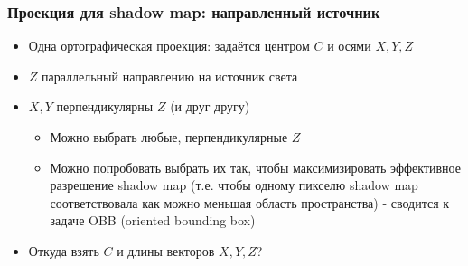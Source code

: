 \documentclass{beamer}
\begin{document}
\begin{frame}[fragile]
\frametitle{Проекция для shadow map: направленный источник}
\begin{itemize}
\item Одна ортографическая проекция: задаётся центром \begin{math}C\end{math} и осями \begin{math}X, Y, Z\end{math}
\pause
\item \begin{math}Z\end{math} параллельный направлению на источник света
\pause
\item \begin{math}X, Y\end{math} перпендикулярны \begin{math}Z\end{math} (и друг другу)
\begin{itemize}
\item Можно выбрать любые, перпендикулярные \begin{math}Z\end{math}
\item Можно попробовать выбрать их так, чтобы максимизировать эффективное разрешение shadow map (т.е. чтобы одному пикселю shadow map соответствовала как можно меньшая область пространства) - сводится к задаче OBB (oriented bounding box)
\end{itemize}
\pause
\item Откуда взять \begin{math}C\end{math} и длины векторов \begin{math}X,Y,Z\end{math}?
\end{itemize}
\end{frame}
\end{document}
